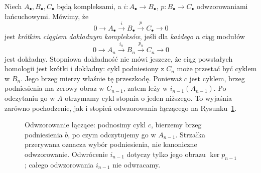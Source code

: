 Niech $A_\bullet,B_\bullet,C_\bullet$ będą
kompleksami, a $i:A_\bullet\to B_\bullet$,
$p:B_\bullet\to C_\bullet$ odwzorowaniami łańcuchowymi.
Mówimy, że
\[
 0\longrightarrow A_\bullet
 \xrightarrow{i}B_\bullet
 \xrightarrow{p}C_\bullet
 \longrightarrow0
\]
jest \emph{krótkim ciągiem dokładnym kompleksów},
jeśli dla \emph{każdego} $n$ ciąg modułów
\begin{equation}\label{eq:ses-kompleks}
 0\longrightarrow A_n\xrightarrow{i_n}B_n
 \xrightarrow{p_n}C_n\longrightarrow0
\end{equation}
jest dokładny. Stopniowa dokładność nie
mówi jeszcze, że ciąg powstałych homologii
jest krótki i dokładny: cykl podniesiony
z $C_n$ może przestać być cyklem w $B_n$.
Jego brzeg mierzy właśnie tę przeszkodę.
Ponieważ $c$ jest cyklem, brzeg podniesienia
ma zerowy obraz w $C_{n-1}$, zatem leży
w $i_{n-1}(A_{n-1})$. Po odczytaniu go w $A$
otrzymamy cykl stopnia o jeden niższego.
To wyjaśnia zarówno pochodzenie, jak i stopień
odwzorowania łączącego na Rysunku~\ref{fig:homologia-delta}.

\begin{figure}[!htbp]
\centering
{}
\caption{Odwzorowanie łączące: podnosimy cykl $c$, bierzemy brzeg
podniesienia $b$, po czym odczytujemy go w $A_{n-1}$.
Strzałka przerywana oznacza wybór podniesienia, nie kanoniczne odwzorowanie.
Odwrócenie $i_{n-1}$ dotyczy tylko jego obrazu
$\ker p_{n-1}$; całego odwzorowania $i_{n-1}$ nie odwracamy.}
\label{fig:homologia-delta}
\end{figure}

